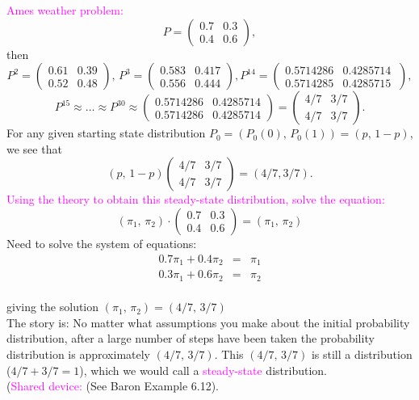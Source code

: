 \documentclass[20pt,landscape]{foils}
\newcommand{\no}{\noindent}
\begin{document}
\no \foilhead[-.8in]{\textcolor{blue}{Examples:}}
\no \textcolor{magenta}{Ames weather problem:}\\
 \[P=\begin{pmatrix}0.7 & 0.3\\
0.4 &  0.6
\end{pmatrix},\] then
\[P^2=\begin{pmatrix}0.61 & 0.39\\
0.52 & 0.48
\end{pmatrix}, \, P^3=\begin{pmatrix}0.583 & 0.417\\
0.556 & 0.444
\end{pmatrix},P^{14}=\begin{pmatrix}0.5714286 & 0.4285714\\
0.5714285 & 0.4285715\
\end{pmatrix},\]\[P^{15}\approx \ldots\approx P^{30}\approx\begin{pmatrix} 0.5714286 & 0.4285714 \\
0.5714286 & 0.4285714
\end{pmatrix}=\begin{pmatrix}4/7 & 3/7\\
4/7&3/7\end{pmatrix}.\]
For any given starting state distribution $P_{0}=(P_{0}(0),\,P_{0}(1))=(p,\,1-p)$,\\
we see that
 \[(p,\,1-p) \begin{pmatrix}4/7 & 3/7\\
4/7&3/7\end{pmatrix}=(4/7, 3/7).\]
\textcolor{magenta}{Using the theory to obtain this steady-state distribution, solve the equation:}\\[-.25in]
$$ (\pi_1,\,\pi_2) \cdot \begin{pmatrix}0.7 & 0.3 \\
0.4 & 0.6
\end{pmatrix}=(\pi_1,\,\pi_2)$$
Need to solve the system of equations:\\[-.3in]
\begin{eqnarray*}
0.7 \pi_1  +0.4 \pi_2 & = & \pi_1\\
0.3 \pi_1  +0.6 \pi_2 & = & \pi_2
\end{eqnarray*}\\[-.3in]
giving the solution $(\pi_1,\,\pi_2)=(4/7,\,3/7)$\\[.1in]
\no The story is: No matter what assumptions you make about the initial
probability distribution, after a large number of steps have been
taken the probability distribution is approximately $(4/7,\,3/7)$.
This $(4/7,\,3/7)$ is still a distribution ($4/7+3/7=1$), which we
would call a \textcolor{magenta}{steady-state }distribution.\\[.1in]
\no (\textcolor{magenta}{Shared device:} (See Baron Example 6.12).
\end{document}

